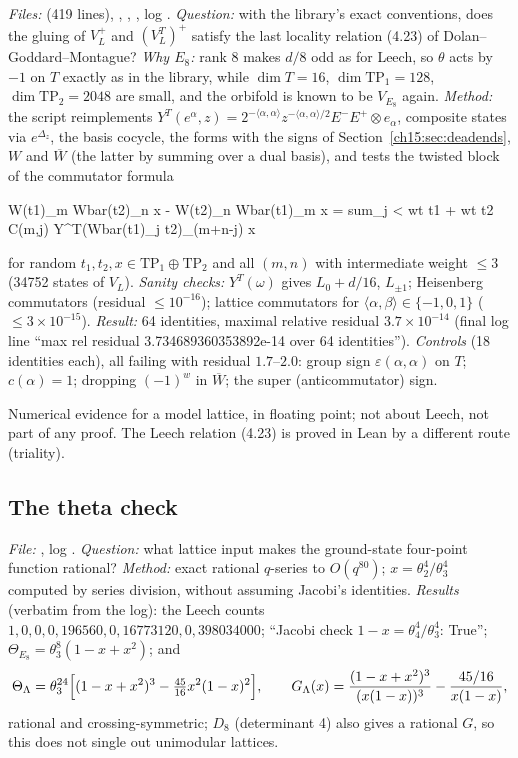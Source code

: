 \emph{Files:}  (419 lines), , , ,
log . \emph{Question:} with the library's exact conventions, does the gluing of
$V_L^+$ and $(V_L^T)^+$ satisfy the last locality relation (4.23) of Dolan--Goddard--Montague?
\emph{Why $E_8$:} rank 8 makes $d/8$ odd as for Leech, so $\theta$ acts by $-1$ on $T$ exactly as in
the library, while $\dim T=16$, $\dim\mathrm{TP}_1=128$, $\dim\mathrm{TP}_2=2048$ are small, and the
orbifold is known to be $V_{E_8}$ again. \emph{Method:} the script reimplements
$Y^T(e^\alpha,z)=2^{-\langle\alpha,\alpha\rangle}z^{-\langle\alpha,\alpha\rangle/2}E^-E^+\otimes e_\alpha$, composite
states via $e^{\Delta_z}$, the basis cocycle, the forms with the signs of
Section~\ref{ch15:sec:deadends}, $W$ and $\overline W$ (the latter by summing over a dual basis), and
tests the twisted block of the commutator formula
\begin{plaincode}
W(t1)_m Wbar(t2)_n x - W(t2)_n Wbar(t1)_m x = sum_{j < wt t1 + wt t2} C(m,j) Y^T(Wbar(t1)_j t2)_(m+n-j) x
\end{plaincode}
for random $t_1,t_2,x\in\mathrm{TP}_1\oplus\mathrm{TP}_2$ and all $(m,n)$ with intermediate weight $\le3$
(34752 states of $V_L$). \emph{Sanity checks:} $Y^T(\omega)$ gives $L_0+d/16$, $L_{\pm1}$; Heisenberg
commutators (residual $\le10^{-16}$); lattice commutators for $\langle\alpha,\beta\rangle\in\{-1,0,1\}$
($\le3\times10^{-15}$). \emph{Result:} 64 identities, maximal relative residual $3.7\times10^{-14}$
(final log line ``max rel residual 3.734689360353892e-14 over 64 identities''). \emph{Controls}
(18 identities each), all failing with residual $1.7$--$2.0$: group sign $\varepsilon(\alpha,\alpha)$ on
$T$; $c(\alpha)=1$; dropping $(-1)^w$ in $\overline W$; the super (anticommutator) sign.

\begin{status}
Numerical evidence for a model lattice, in floating point; not about Leech, not part of any
proof. The Leech relation (4.23) is proved in Lean by a different route (triality).
\end{status}

\subsection{The theta check}

\emph{File:} , log . \emph{Question:} what lattice
input makes the ground-state four-point function rational? \emph{Method:} exact rational $q$-series
to $O(q^{80})$; $x=\theta_2^4/\theta_3^4$ computed by series division, without assuming Jacobi's
identities. \emph{Results} (verbatim from the log): the Leech counts
$1,0,0,0,196560,0,16773120,0,398034000$; ``Jacobi check $1-x=\theta_4^4/\theta_3^4$: True'';
$\Theta_{E_8}=\theta_3^8(1-x+x^2)$; and
\begin{equation*}
  \Theta_\Lambda=\theta_3^{24}\Bigl[(1-x+x^2)^3-\tfrac{45}{16}x^2(1-x)^2\Bigr],\qquad
  G_\Lambda(x)=\frac{(1-x+x^2)^3}{(x(1-x))^3}-\frac{45/16}{x(1-x)},
\end{equation*}
rational and crossing-symmetric; $D_8$ (determinant 4) also gives a rational $G$, so this does not
single out unimodular lattices.

